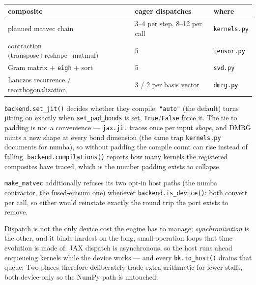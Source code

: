 \documentclass[11pt]{article}
\begin{document}
\begin{center}
\begin{tabular}{@{}lll@{}}
\toprule
composite & eager dispatches & where \\
\midrule
planned matvec chain & 3--4 per step, 8--12 per call & \texttt{kernels.py} \\
contraction (transpose+reshape+matmul) & 5 & \texttt{tensor.py} \\
Gram matrix + \texttt{eigh} + sort & 5 & \texttt{svd.py} \\
Lanczos recurrence / reorthogonalization & 3 / 2 per basis vector & \texttt{dmrg.py} \\
\bottomrule
\end{tabular}
\end{center}

\texttt{backend.set\_jit()} decides whether they compile: \texttt{"auto"}
(the default) turns jitting on exactly when \texttt{set\_pad\_bonds} is
set, \texttt{True}/\texttt{False} force it. The tie to padding is not a
convenience --- \texttt{jax.jit} traces once per input \emph{shape}, and
DMRG mints a new shape at every bond dimension (the same trap
\texttt{kernels.py} documents for numba), so without padding the compile
count can rise instead of falling. \texttt{backend.compilations()}
reports how many kernels the registered composites have traced, which is
the number padding exists to collapse.

\texttt{make\_matvec} additionally refuses its two opt-in host paths (the
numba contractor, the fused-einsum one) whenever
\texttt{backend.is\_device()}: both convert per call, so either would
reinstate exactly the round trip the port exists to remove.

Dispatch is not the only device cost the engine has to manage;
\emph{synchronization} is the other, and it binds hardest on the long,
small-operation loops that time evolution is made of. JAX dispatch is
asynchronous, so the host runs ahead enqueueing kernels while the device
works --- and every \texttt{bk.to\_host()} drains that queue. Two places
therefore deliberately trade extra arithmetic for fewer stalls, both
device-only so the NumPy path is untouched:
\end{document}
